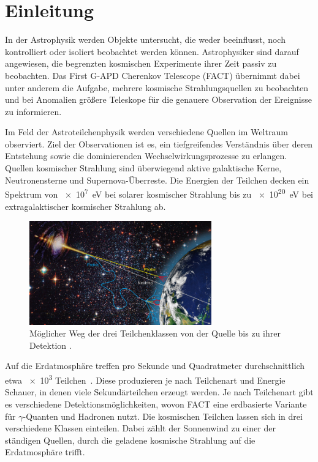 \chapter{Einleitung}
In der Astrophysik werden Objekte untersucht, die weder beeinflusst, noch kontrolliert oder isoliert beobachtet werden können.
Astrophysiker sind darauf angewiesen, die begrenzten kosmischen Experimente ihrer Zeit passiv zu beobachten. 
Das First G-APD Cherenkov Telescope (FACT) übernimmt dabei unter anderem die Aufgabe, mehrere kosmische Strahlungsquellen zu beobachten und bei Anomalien größere Teleskope für die genauere Observation der Ereignisse zu informieren. 

Im Feld der Astroteilchenphysik werden verschiedene Quellen im Weltraum observiert.
Ziel der Observationen ist es, ein tiefgreifendes Verständnis über deren Entstehung sowie die dominierenden Wechselwirkungsprozesse zu erlangen. 
Quellen kosmischer Strahlung sind überwiegend aktive galaktische Kerne, Neutronensterne und Supernova-Überreste. 
Die Energien der Teilchen decken ein Spektrum von \SI{e7}{\electronvolt} bei solarer kosmischer Strahlung bis zu \SI{e20}{\electronvolt} bei extragalaktischer kosmischer Strahlung ab. 

\begin{figure}
  \centering
  \includegraphics[width=0.7\textwidth]{./images/sources-detection.jpg}
  \caption{Möglicher Weg der drei Teilchenklassen von der Quelle bis zu ihrer Detektion \cite{overview-detec}.}
\end{figure}

Auf die Erdatmosphäre treffen pro Sekunde und Quadratmeter durchschnittlich etwa \num{e3} Teilchen~\cite{gaisser}.
Diese produzieren je nach Teilchenart und Energie Schauer, in denen viele Sekundärteilchen erzeugt werden. 
Je nach Teilchenart gibt es verschiedene Detektionsmöglichkeiten, wovon FACT eine erdbasierte Variante für $\gamma$-Quanten und Hadronen nutzt. 
Die kosmischen Teilchen lassen sich in drei verschiedene Klassen einteilen. 
Dabei zählt der Sonnenwind zu einer der ständigen Quellen, durch die geladene kosmische Strahlung auf die Erdatmosphäre trifft.


